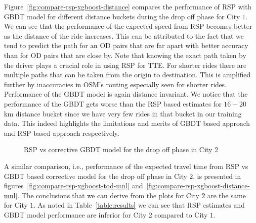 Figure~\ref{fig:compare-rsp-xgboost-distance} compares the performance of \ac{RSP} with GBDT model for different distance buckets during the drop off phase for City $1$. We can see that the performance of the expected speed from \ac{RSP} becomes better as the distance of the ride increases. This can be attributed to the fact that we tend to predict the path for an \ac{OD} pairs that are far apart with better accuracy than for OD pairs that are close by. Note that knowing the exact path taken by the driver plays a crucial role in using RSP for TTE. For shorter rides there are multiple paths that can be taken from the origin to destination. This is amplified further by inaccuracies in \ac{OSM}'s routing especially seen for shorter rides. Performance of the GBDT model is again distance invariant. We notice that the performance of the GBDT gets worse than the RSP based estimates for  $16-20$ km distance bucket since we have very few rides in that bucket in our training data. 
This indeed highlights the limitations and merits of GBDT based approach and RSP based approach respectively.  

\begin{figure}[!tb]
	\centering
	\vfill%
	\label{fig:eval-dropoff-mnl}
	\caption{\ac{RSP} vs corrective GBDT model for the drop off phase in City $2$}
\end{figure} 

A similar comparison, i.e., performance of the expected travel time from \ac{RSP} vs GBDT based corrective model for the drop off phase in City $2$, 
is presented in figures~\ref{fig:compare-rsp-xgboost-tod-mnl} and~\ref{fig:compare-rsp-xgboost-distance-mnl}. The conclusions that we can derive from the plots for City $2$ are the same for City $1$. As noted in Table~\ref{table:results} we can see that \ac{RSP} estimates and GBDT model performance are inferior for City $2$ compared to City $1$.
